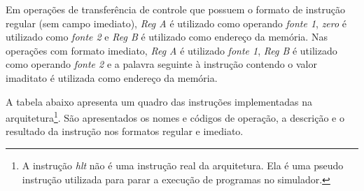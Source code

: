 \documentclass[11pt,a4paper]{report}
\begin{document}
Em operações de transferência de controle que possuem o formato de
instrução regular (sem campo imediato), \textit{Reg A} é utilizado como
operando \textit{fonte 1}, \textit{zero} é utilizado como \textit{fonte 2}
e \textit{Reg B} é utilizado como endereço da memória. Nas operações com
formato imediato, \textit{Reg A} é utilizado \textit{fonte 1},
\textit{Reg B} é utilizado como operando \textit{fonte 2} e a palavra
seguinte à instrução contendo o valor imaditato é utilizada como
endereço da memória.

A tabela abaixo apresenta um quadro das instruções implementadas na
arquitetura\footnote{A instrução \textit{hlt} não é uma instrução real
da arquitetura. Ela é uma pseudo instrução utilizada para parar a
execução de programas no simulador.}. São apresentados os nomes e códigos
de operação, a descrição e o resultado da instrução nos formatos regular
e imediato.
\end{document}
